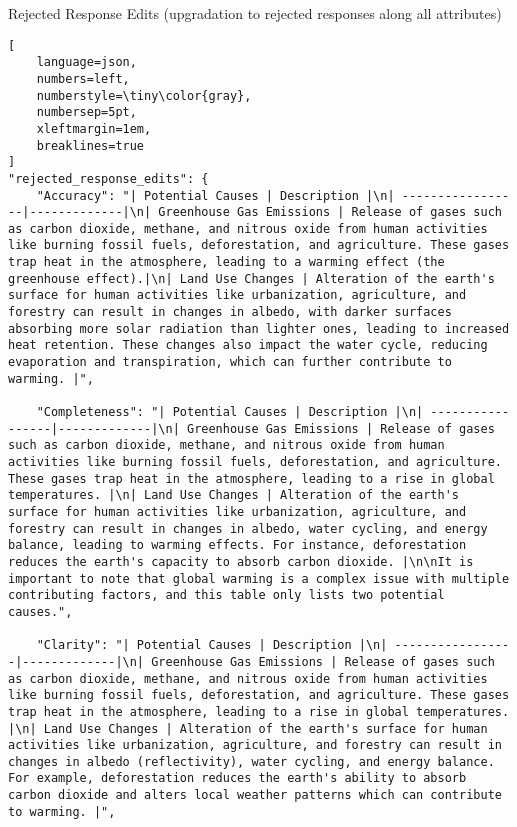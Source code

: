 \begin{promptbox}{Rejected Response Edits (upgradation to rejected responses along all attributes)}
    \begin{lstlisting}[
    language=json,
    numbers=left,
    numberstyle=\tiny\color{gray},
    numbersep=5pt,
    xleftmargin=1em,
    breaklines=true
]
"rejected_response_edits": {
    "Accuracy": "| Potential Causes | Description |\n| -----------------|-------------|\n| Greenhouse Gas Emissions | Release of gases such as carbon dioxide, methane, and nitrous oxide from human activities like burning fossil fuels, deforestation, and agriculture. These gases trap heat in the atmosphere, leading to a warming effect (the greenhouse effect).|\n| Land Use Changes | Alteration of the earth's surface for human activities like urbanization, agriculture, and forestry can result in changes in albedo, with darker surfaces absorbing more solar radiation than lighter ones, leading to increased heat retention. These changes also impact the water cycle, reducing evaporation and transpiration, which can further contribute to warming. |",
    
    "Completeness": "| Potential Causes | Description |\n| -----------------|-------------|\n| Greenhouse Gas Emissions | Release of gases such as carbon dioxide, methane, and nitrous oxide from human activities like burning fossil fuels, deforestation, and agriculture. These gases trap heat in the atmosphere, leading to a rise in global temperatures. |\n| Land Use Changes | Alteration of the earth's surface for human activities like urbanization, agriculture, and forestry can result in changes in albedo, water cycling, and energy balance, leading to warming effects. For instance, deforestation reduces the earth's capacity to absorb carbon dioxide. |\n\nIt is important to note that global warming is a complex issue with multiple contributing factors, and this table only lists two potential causes.",
    
    "Clarity": "| Potential Causes | Description |\n| -----------------|-------------|\n| Greenhouse Gas Emissions | Release of gases such as carbon dioxide, methane, and nitrous oxide from human activities like burning fossil fuels, deforestation, and agriculture. These gases trap heat in the atmosphere, leading to a rise in global temperatures. |\n| Land Use Changes | Alteration of the earth's surface for human activities like urbanization, agriculture, and forestry can result in changes in albedo (reflectivity), water cycling, and energy balance. For example, deforestation reduces the earth's ability to absorb carbon dioxide and alters local weather patterns which can contribute to warming. |",
    

\end{lstlisting}
\end{promptbox}
